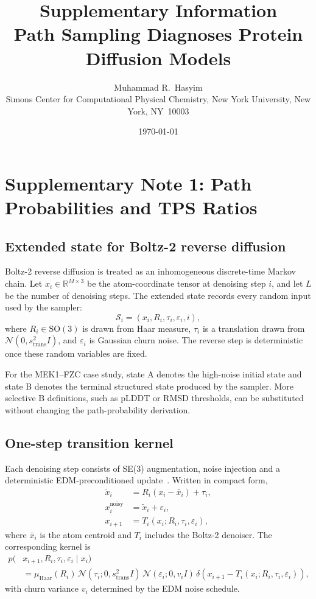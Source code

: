 \documentclass[11pt,a4paper]{article}
\title{\textbf{Supplementary Information}\\[4pt]
Path Sampling Diagnoses Protein Diffusion Models}
\author{Muhammad R.~Hasyim\\
\small Simons Center for Computational Physical Chemistry,
New York University, New York, NY~10003}
\date{\today}
\newcommand{\R}{\mathbb{R}}
\newcommand{\N}{\mathcal{N}}
\newcommand{\Haar}{\mu_{\mathrm{Haar}}}
\newcommand{\xnoisy}{x^{\mathrm{noisy}}}
\newcommand{\xtilde}{\tilde x}
\begin{document}
\maketitle
\tableofcontents
\newpage

\section{Supplementary Note 1: Path Probabilities and TPS Ratios}
\label{sec:path-prob}

\subsection{Extended state for Boltz-2 reverse diffusion}

Boltz-2 reverse diffusion is treated as an inhomogeneous discrete-time Markov
chain. Let $x_i \in \R^{M \times 3}$ be the atom-coordinate tensor at
denoising step $i$, and let $L$ be the number of denoising steps. The extended
state records every random input used by the sampler:
\begin{equation}
  \mathcal{S}_i = (x_i, R_i, \tau_i, \varepsilon_i, i),
\end{equation}
where $R_i \in \mathrm{SO}(3)$ is drawn from Haar measure, $\tau_i$ is a
translation drawn from $\N(0,s_{\mathrm{trans}}^2 I)$, and
$\varepsilon_i$ is Gaussian churn noise. The reverse step is deterministic
once these random variables are fixed.

For the MEK1--FZC case study, state A denotes the high-noise initial state and
state B denotes the terminal structured state produced by the sampler. More
selective B definitions, such as pLDDT or RMSD thresholds, can be substituted
without changing the path-probability derivation.

\subsection{One-step transition kernel}

Each denoising step consists of SE(3) augmentation, noise injection and a
deterministic EDM-preconditioned update~\cite{karras2022}. Written in compact
form,
\begin{align}
  \xtilde_i &= R_i (x_i-\bar x_i) + \tau_i,\\
  \xnoisy_i &= \xtilde_i + \varepsilon_i,\\
  x_{i+1} &= T_i(x_i;R_i,\tau_i,\varepsilon_i),
\end{align}
where $\bar x_i$ is the atom centroid and $T_i$ includes the Boltz-2 denoiser.
The corresponding kernel is
\begin{align}
  p(&x_{i+1}, R_i,\tau_i,\varepsilon_i \mid x_i) \nonumber\\
  &=
  \Haar(R_i)\,
  \N(\tau_i;0,s_{\mathrm{trans}}^2I)\,
  \N(\varepsilon_i;0,v_iI)\,
  \delta\!\left(x_{i+1}-T_i(x_i;R_i,\tau_i,\varepsilon_i)\right),
  \label{eq:transition-kernel}
\end{align}
with churn variance $v_i$ determined by the EDM noise schedule.
\end{document}
